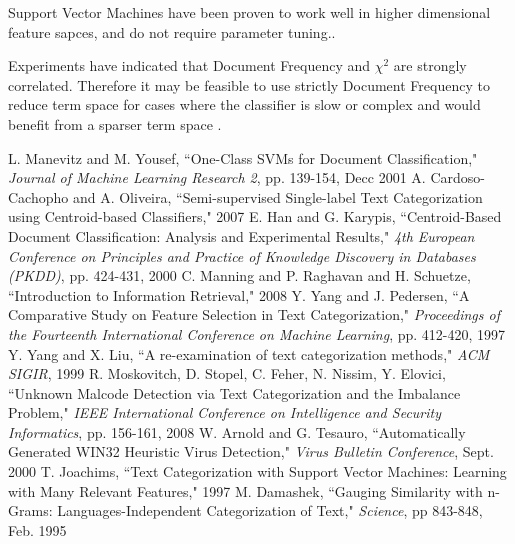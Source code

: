 \documentclass[11pt,twocolumn]{article}
\begin{document}
Support Vector Machines have been proven to work well in higher dimensional feature sapces, and do not require parameter tuning.\cite{Joac1997}.

Experiments have indicated that Document Frequency and $\chi^2$ are strongly correlated.  Therefore it may be feasible to use strictly Document Frequency to reduce term space for cases where the classifier is slow or complex and would benefit from a sparser term space \cite{Yang1997}.

\begin{thebibliography}{10}
L. Manevitz and M. Yousef, ``One-Class SVMs for Document Classification," \emph{Journal of Machine Learning Research 2}, pp. 139-154, Decc 2001
A. Cardoso-Cachopho and A. Oliveira, ``Semi-supervised Single-label Text Categorization using Centroid-based Classifiers," 2007
E. Han and G. Karypis, ``Centroid-Based Document Classification: Analysis and Experimental Results," \emph{4th European Conference on Principles and Practice of Knowledge Discovery in Databases (PKDD)}, pp. 424-431, 2000
C. Manning and P. Raghavan and H. Schuetze, ``Introduction to Information Retrieval," 2008
Y. Yang and J. Pedersen, ``A Comparative Study on Feature Selection in Text Categorization," \emph{Proceedings of the Fourteenth International Conference on Machine Learning}, pp. 412-420, 1997
Y. Yang and X. Liu, ``A re-examination of text categorization methods," \emph{ACM SIGIR}, 1999
R. Moskovitch, D. Stopel, C. Feher, N. Nissim, Y. Elovici, ``Unknown Malcode Detection via Text Categorization and the Imbalance Problem," \emph{IEEE International Conference on Intelligence and Security Informatics}, pp. 156-161, 2008
W. Arnold and G. Tesauro, ``Automatically Generated WIN32 Heuristic Virus Detection," \emph{Virus Bulletin Conference}, Sept. 2000
T. Joachims, ``Text Categorization with Support Vector Machines: Learning with Many Relevant Features," 1997
M. Damashek, ``Gauging Similarity with n-Grams: Languages-Independent Categorization of Text," \emph{Science}, pp 843-848, Feb. 1995
\end{thebibliography}
\end{document}
